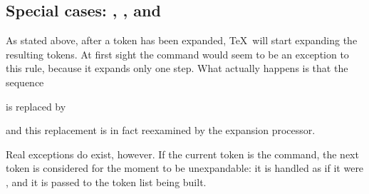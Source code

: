 \documentclass{book}
\begin{document}
\subsection{Special cases: , , and }

As stated above,
after a token has been expanded, \TeX\ will start expanding
the resulting tokens. At first sight the 
command would seem to be an exception to this rule, because
it expands only one step. What actually happens is that
the sequence \begin{disp}\end{disp}
is replaced by 
\begin{disp}\end{disp}
and this replacement is in fact reexamined by the expansion
processor.

Real exceptions do exist, however. If the 
current token is the  command, the next
token is considered for the moment to be unexpandable:
it is handled as if it were , and it is
passed to the token list being built.
\end{document}
